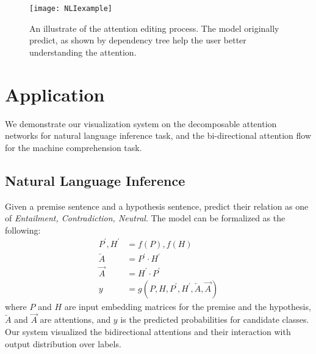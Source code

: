 
\begin{figure*}[t]
\centering
\vspace{-2mm}
 \texttt{[image: NLIexample]}
  \vspace{-6mm}
 \caption{
An illustrate of the attention editing process. 
The model originally predict, as shown by dependency tree help the user better understanding the attention. 
}
\label{fig:NLIexample}
\end{figure*}

\section{Application}
We demonstrate our visualization system on the decomposable attention networks
for natural language inference task, and the bi-directional attention flow for the machine comprehension task.

\subsection{Natural Language Inference}
\label{sec:NLIexample}
Given a premise sentence and a hypothesis sentence,
predict their relation as one of \emph{Entailment, Contradiction, Neutral}.
The model can be formalized as the following:
\begin{align}
	P^\prime, H^\prime &= f(P), f(H)\\
	\overleftarrow{A} &= P^\prime \cdot H^\prime\\
	\overrightarrow{A} &= H^\prime \cdot P^\prime\\
	y &= g(P, H, P^\prime, H^\prime, \overleftarrow{A}, \overrightarrow{A})
\end{align}
where $P$ and $H$ are input embedding matrices for the premise and the hypothesis, $\overleftarrow{A}$
and $\overrightarrow{A}$ are attentions, and $y$ is the predicted probabilities for candidate classes.
Our system visualized the bidirectional attentions and their interaction with output distribution over labels.

